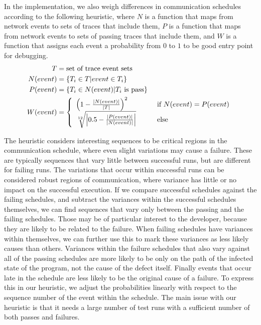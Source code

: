 \documentclass[preprint,3p]{elsarticle}
\begin{document}
In the implementation, we also weigh differences in communication schedules
according to the following heuristic, where $N$ is a function that maps from
network events to sets of traces that include them, $P$ is a function that maps
from network events to sets of passing traces that include them, and $W$ is a
function that assigns each event a probability from $0$ to $1$ to be good entry
point for debugging.
\begin{align*}
  \label{eq:1}
  T & = \text{set of trace event sets} \\
  N(event) & = \{ T_{i} \in T | event \in T_{i} \} \\
  P(event) & = \{ T_{i} \in N(event) | T_{i} \text{ is pass} \} \\
  W(event) & = \left\{
    \begin{array}{l l}
      \left(1 - \frac{|N(event)|}{|T|}\right)^2 & \qquad \text{if } N(event) = P(event) \\
      \sqrt[12]{\left|0.5 - \frac{|P(event)|}{|N(event)|}\right|} & \qquad \text{else}
    \end{array}
  \right.
\end{align*}

The heuristic considers interesting sequences to be critical regions in the
communication schedule, where even slight variations may cause a failure. These
are typically sequences that vary little between successful runs, but are
different for failing runs. The variations that occur within successful runs can
be considered robust regions of communication, where variance has little or no
impact on the successful execution. If we compare successful schedules against
the failing schedules, and subtract the variances within the successful
schedules themselves, we can find sequences that vary only between the passing
and the failing schedules. Those may be of particular interest to the developer,
because they are likely to be related to the failure. When failing schedules
have variances within themselves, we can further use this to mark these
variances as less likely causes than others.  Variances within the failure
schedules that also vary against all of the passing schedules are more likely to
be only on the path of the infected state of the program, not the cause of the
defect itself. Finally events that occur late in the schedule are less likely to
be the original cause of a failure. To express this in our heuristic, we adjust
the probabilities linearly with respect to the sequence number of the event
within the schedule. The main issue with our heuristic is that it needs a large
number of test runs with a sufficient number of both passes and failures.
\end{document}
